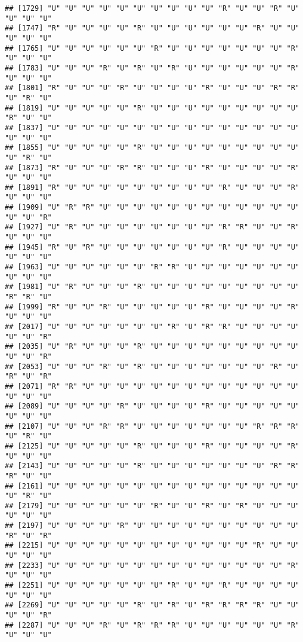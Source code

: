 \documentclass[
]{article}
\begin{document}
\begin{verbatim}
## [1729] "U" "U" "U" "U" "U" "U" "U" "U" "U" "U" "R" "U" "U" "R" "U" "U" "U" "U"
## [1747] "R" "U" "U" "U" "U" "R" "U" "U" "U" "U" "U" "U" "R" "U" "U" "U" "U" "U"
## [1765] "U" "U" "U" "U" "U" "U" "R" "U" "U" "U" "U" "U" "U" "U" "R" "U" "U" "U"
## [1783] "U" "U" "U" "R" "U" "R" "U" "R" "U" "U" "U" "U" "U" "U" "R" "U" "U" "U"
## [1801] "R" "U" "U" "U" "R" "U" "U" "U" "U" "R" "U" "U" "U" "R" "R" "U" "R" "U"
## [1819] "U" "U" "U" "U" "U" "R" "U" "U" "U" "U" "U" "U" "U" "U" "U" "R" "U" "U"
## [1837] "U" "U" "U" "U" "U" "U" "U" "U" "U" "U" "U" "U" "U" "U" "U" "U" "U" "U"
## [1855] "U" "U" "U" "U" "U" "R" "U" "U" "U" "U" "U" "U" "U" "U" "U" "U" "R" "U"
## [1873] "R" "U" "U" "U" "R" "R" "U" "U" "U" "R" "U" "U" "U" "U" "R" "U" "U" "U"
## [1891] "R" "U" "U" "U" "U" "U" "U" "U" "U" "U" "R" "U" "U" "U" "R" "U" "U" "U"
## [1909] "U" "R" "R" "U" "U" "U" "U" "U" "U" "U" "U" "U" "U" "U" "U" "U" "U" "R"
## [1927] "U" "R" "U" "U" "U" "U" "U" "U" "U" "U" "R" "R" "U" "U" "R" "U" "U" "U"
## [1945] "R" "U" "R" "U" "U" "U" "U" "U" "U" "U" "R" "U" "U" "U" "U" "U" "U" "U"
## [1963] "U" "U" "U" "U" "U" "U" "R" "R" "U" "U" "U" "U" "U" "U" "U" "U" "U" "U"
## [1981] "U" "R" "U" "U" "U" "R" "U" "U" "U" "U" "U" "U" "U" "U" "U" "R" "R" "U"
## [1999] "R" "U" "U" "R" "U" "U" "U" "U" "U" "R" "U" "U" "U" "U" "R" "U" "U" "U"
## [2017] "U" "U" "U" "U" "U" "U" "U" "R" "U" "R" "R" "U" "U" "U" "U" "U" "U" "R"
## [2035] "U" "R" "U" "U" "U" "R" "U" "U" "U" "U" "U" "U" "U" "U" "U" "U" "U" "R"
## [2053] "U" "U" "U" "R" "U" "R" "U" "U" "U" "U" "U" "U" "U" "R" "U" "R" "U" "R"
## [2071] "R" "R" "U" "U" "U" "U" "U" "U" "U" "U" "U" "U" "U" "U" "U" "U" "U" "U"
## [2089] "U" "U" "U" "U" "R" "U" "U" "U" "U" "R" "U" "U" "U" "U" "U" "U" "U" "U"
## [2107] "U" "U" "U" "R" "R" "U" "U" "U" "U" "U" "U" "U" "R" "R" "R" "U" "R" "U"
## [2125] "U" "U" "U" "U" "U" "R" "U" "U" "U" "R" "U" "U" "U" "U" "R" "U" "U" "U"
## [2143] "U" "U" "U" "U" "U" "R" "U" "U" "U" "U" "U" "U" "U" "R" "R" "R" "U" "U"
## [2161] "U" "U" "U" "U" "U" "U" "U" "U" "U" "U" "U" "U" "U" "U" "U" "U" "R" "U"
## [2179] "U" "U" "U" "U" "U" "U" "R" "U" "U" "R" "U" "R" "U" "U" "U" "U" "U" "U"
## [2197] "U" "U" "U" "U" "R" "U" "U" "U" "U" "U" "U" "U" "U" "U" "U" "R" "U" "R"
## [2215] "U" "U" "U" "U" "U" "U" "U" "U" "U" "U" "U" "U" "R" "U" "U" "U" "U" "U"
## [2233] "U" "U" "U" "U" "U" "U" "U" "U" "U" "U" "U" "U" "U" "U" "R" "U" "U" "U"
## [2251] "U" "U" "U" "U" "U" "U" "U" "R" "U" "U" "R" "U" "U" "U" "U" "U" "U" "U"
## [2269] "U" "U" "U" "U" "U" "R" "U" "R" "U" "R" "R" "R" "R" "U" "U" "U" "U" "R"
## [2287] "U" "U" "U" "R" "U" "R" "R" "R" "U" "U" "U" "U" "U" "U" "R" "U" "U" "U"

\end{verbatim}
\end{document}
